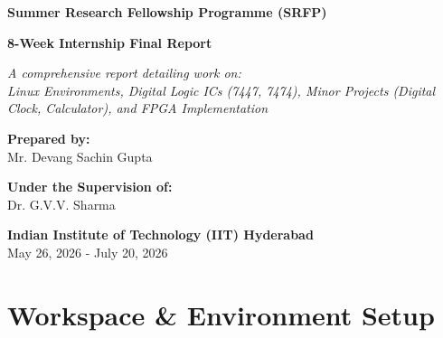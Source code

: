 \documentclass[12pt, a4paper]{report}
\begin{document}
\begin{titlepage}
    \centering
    \vspace*{2cm}
    
    {\Huge \bfseries Summer Research Fellowship Programme (SRFP)\par}
    \vspace{1cm}
    {\Large \bfseries 8-Week Internship Final Report\par}
    
    \vspace{2.5cm}
    {\large \textit{A comprehensive report detailing work on:\\ Linux Environments, Digital Logic ICs (7447, 7474), Minor Projects (Digital Clock, Calculator), and FPGA Implementation}\par}
    
    \vspace{2.5cm}
    {\Large \textbf{Prepared by:}\\ Mr. Devang Sachin Gupta\par}
    
    \vspace{1.5cm}
    {\Large \textbf{Under the Supervision of:}\\ Dr. G.V.V. Sharma\par}
    
    \vspace{1.5cm}
    {\Large \textbf{Indian Institute of Technology (IIT) Hyderabad}\\May 26, 2026 - July 20, 2026\par}
    \vspace{0.5cm}
    
\end{titlepage}

\tableofcontents
\newpage

\chapter{Workspace \& Environment Setup}
\end{document}
